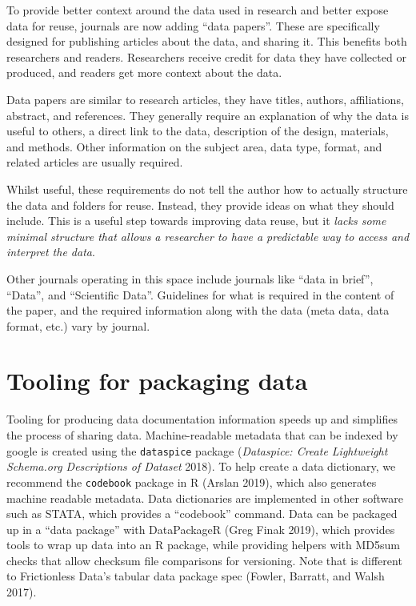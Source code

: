 \documentclass[
]{article}
\begin{document}
To provide better context around the data used in research and better expose data for reuse, journals are now adding ``data papers''. These are specifically designed for publishing articles about the data, and sharing it. This benefits both researchers and readers. Researchers receive credit for data they have collected or produced, and readers get more context about the data.

Data papers are similar to research articles, they have titles, authors, affiliations, abstract, and references. They generally require an explanation of why the data is useful to others, a direct link to the data, description of the design, materials, and methods. Other information on the subject area, data type, format, and related articles are usually required.

Whilst useful, these requirements do not tell the author how to actually structure the data and folders for reuse. Instead, they provide ideas on what they should include. This is a useful step towards improving data reuse, but it \emph{lacks some minimal structure that allows a researcher to have a predictable way to access and interpret the data}.

Other journals operating in this space include journals like ``data in brief'', ``Data'', and ``Scientific Data''. Guidelines for what is required in the content of the paper, and the required information along with the data (meta data, data format, etc.) vary by journal.

\hypertarget{tooling}{%
\section{Tooling for packaging data}\label{tooling}}

Tooling for producing data documentation information speeds up and simplifies the process of sharing data. Machine-readable metadata that can be indexed by google is created using the \texttt{dataspice} package (\emph{Dataspice: Create Lightweight Schema.org Descriptions of Dataset} 2018). To help create a data dictionary, we recommend the \texttt{codebook} package in R (Arslan 2019), which also generates machine readable metadata. Data dictionaries are implemented in other software such as STATA, which provides a ``codebook'' command. Data can be packaged up in a ``data package'' with DataPackageR (Greg Finak 2019), which provides tools to wrap up data into an R package, while providing helpers with MD5sum checks that allow checksum file comparisons for versioning. Note that is different to Frictionless Data's tabular data package spec (Fowler, Barratt, and Walsh 2017).
\end{document}
